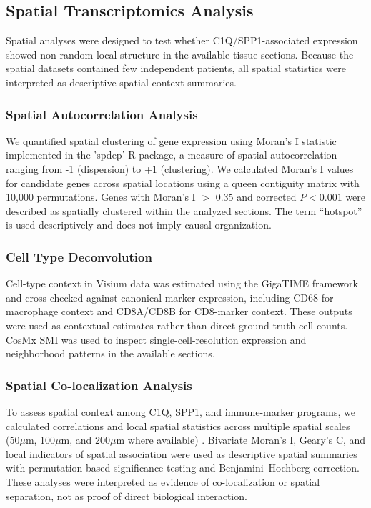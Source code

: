 \documentclass[pdflatex,sn-mathphys-num,referee,lineno]{sn-jnl}
\theoremstyle{thmstyleone}%
\theoremstyle{thmstyletwo}%
\theoremstyle{thmstylethree}%
\begin{document}
\subsection{Spatial Transcriptomics Analysis}\label{subsec:spatial_methods}

Spatial analyses were designed to test whether C1Q/SPP1-associated expression showed non-random local structure in the available tissue sections. Because the spatial datasets contained few independent patients, all spatial statistics were interpreted as descriptive spatial-context summaries.

\subsubsection{Spatial Autocorrelation Analysis}
We quantified spatial clustering of gene expression using Moran's I statistic implemented in the 'spdep' R package, a measure of spatial autocorrelation ranging from -1 (dispersion) to +1 (clustering). We calculated Moran's I values for candidate genes across spatial locations using a queen contiguity matrix with 10,000 permutations. Genes with Moran's I $>$ 0.35 and corrected $P < 0.001$ were described as spatially clustered within the analyzed sections. The term ``hotspot'' is used descriptively and does not imply causal organization.

\subsubsection{Cell Type Deconvolution}
Cell-type context in Visium data was estimated using the GigaTIME framework and cross-checked against canonical marker expression, including CD68 for macrophage context and CD8A/CD8B for CD8-marker context. These outputs were used as contextual estimates rather than direct ground-truth cell counts. CosMx SMI was used to inspect single-cell-resolution expression and neighborhood patterns in the available sections.

\subsubsection{Spatial Co-localization Analysis}
To assess spatial context among C1Q, SPP1, and immune-marker programs, we calculated correlations and local spatial statistics across multiple spatial scales (50$\mu$m, 100$\mu$m, and 200$\mu$m where available) \cite{raviSpatiallyResolvedMultiomics2022, liSpatialTranscriptomicsTumor2022}. Bivariate Moran's I, Geary's C, and local indicators of spatial association were used as descriptive spatial summaries with permutation-based significance testing and Benjamini--Hochberg correction. These analyses were interpreted as evidence of co-localization or spatial separation, not as proof of direct biological interaction.
\end{document}
